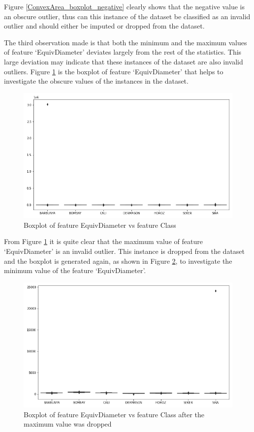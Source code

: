 \documentclass[10pt, conference]{IEEEtran}
\begin{document}
Figure \ref{ConvexArea_boxplot_negative} clearly shows that the negative value is an obscure outlier, thus can this
instance of the dataset be classified as an invalid outlier and should either be imputed or dropped from the dataset.

The third observation made is that both the minimum and the maximum values of feature `EquivDiameter' deviates
largely from the rest of the statistics. This large deviation may indicate that these instances of the dataset
are also invalid outliers. Figure \ref{EquivDiameter boxplot before} is the boxplot of feature `EquivDiameter'
that helps to investigate the obscure values of the instances in the dataset.
\begin{figure}[H]
    \centerline{\includegraphics[scale=0.35]{../Plots/EquivDiameter outlier boxplot.png}}
    \caption{Boxplot of feature EquivDiameter vs feature Class}
    \label{EquivDiameter boxplot before}
\end{figure}

From Figure \ref{EquivDiameter boxplot before} it is quite clear that the maximum value of feature `EquivDiameter'
is an invalid outlier. This instance is dropped from the dataset and the boxplot is generated again, as shown
in Figure \ref{EquivDiameter boxplot before 2}, to investigate the minimum value of the feature `EquivDiameter'.
\begin{figure}[h!]
    \centerline{\includegraphics[scale=0.35]{../Plots/EquivDiameter outlier boxplot 2.png}}
    \caption{Boxplot of feature EquivDiameter vs feature Class after the maximum value was dropped}
    \label{EquivDiameter boxplot before 2}
\end{figure}
\end{document}
